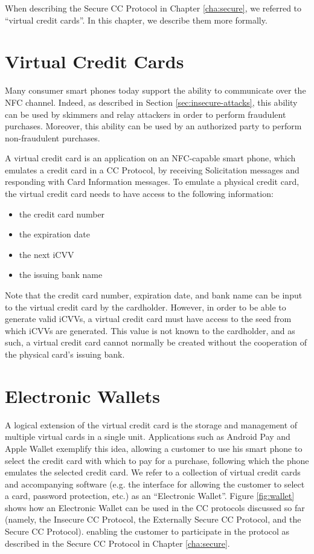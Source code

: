 When describing the Secure CC Protocol in Chapter \ref{cha:secure}, we referred to ``virtual credit cards''.
In this chapter, we describe them more formally.

\section{Virtual Credit Cards}

Many consumer smart phones today support the ability to communicate over the NFC channel.
Indeed, as described in Section \ref{sec:insecure-attacks}, this ability can be used by skimmers and relay attackers in order to perform fraudulent purchases.
Moreover, this ability can be used by an authorized party to perform non-fraudulent purchases.

A virtual credit card is an application on an NFC-capable smart phone, which emulates a credit card in a CC Protocol,
    by receiving Solicitation messages and responding with Card Information messages.
To emulate a physical credit card, the virtual credit card needs to have access to the following information:

\begin{itemize}
\item the credit card number
\item the expiration date
\item the next iCVV
\item the issuing bank name
\end{itemize}

Note that the credit card number, expiration date, and bank name can be input to the virtual credit card by the cardholder.
However, in order to be able to generate valid iCVVs, a virtual credit card must have access to the seed from which iCVVs are generated.
This value is not known to the cardholder, and as such, a virtual credit card cannot normally be created without the cooperation of the physical card's issuing bank.


\section{Electronic Wallets}
A logical extension of the virtual credit card is the storage and management of multiple virtual cards in a single unit.
Applications such as Android Pay and Apple Wallet exemplify this idea,
    allowing a customer to use his smart phone to select the credit card with which to pay for a purchase,
    following which the phone emulates the selected credit card.
We refer to a collection of virtual credit cards and accompanying software
    (e.g. the interface for allowing the customer to select a card, password protection, etc.) as an ``Electronic Wallet''.
Figure \ref{fig:wallet} shows how an Electronic Wallet can be used in the CC protocols discussed so far
    (namely, the Insecure CC Protocol, the Externally Secure CC Protocol, and the Secure CC Protocol).
    enabling the customer to participate in the protocol as described in the Secure CC Protocol in Chapter \ref{cha:secure}.

